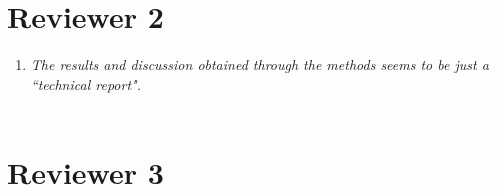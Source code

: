 \documentclass[a4paper]{amsart}
\theoremstyle{plain}
\theoremstyle{definition}
\theoremstyle{remark}
\numberwithin{equation}{section}
\begin{document}

\section*{Reviewer 2}


\begin{enumerate}

\item \emph{The results and discussion obtained through the methods seems to be just a ``technical report".}\\

{\color{blue}{details.}}\\


\end{enumerate}


\section*{Reviewer 3}
\end{document}
